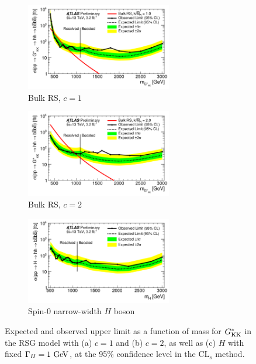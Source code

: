 \begin{figure}[!ht]
\centering
\captionsetup{justification=centering}

    \begin{subfigure}[t]{\textwidth}
        \centering
        \includegraphics[width=0.7\textwidth]{figures/Limit_RSG_c1}
        \caption{Bulk RS, $c = 1$}
    \end{subfigure}%

    \begin{subfigure}[t]{\textwidth}
        \centering
        \includegraphics[width=0.7\textwidth]{figures/Limit_RSG_c2}
        \caption{Bulk RS, $c = 2$}
    \end{subfigure}%

    \begin{subfigure}[t]{\textwidth}
        \centering
        \includegraphics[width=0.7\textwidth]{figures/Limit_H}
        \caption{Spin-0 narrow-width $H$ boson}
    \end{subfigure}%
\caption{Expected and observed upper limit as a function of mass for $G^*_{\rm KK}$ in the RSG model with (a) $c = 1$
  and (b) $c = 2$, as well as (c) $H$ with fixed $\Gamma_H = 1\,\GeV{}$, at the 95\% confidence level in the CL$_{s}$ method.~\cite{4bconf}}
\label{fig:4b_limits}
\end{figure}

